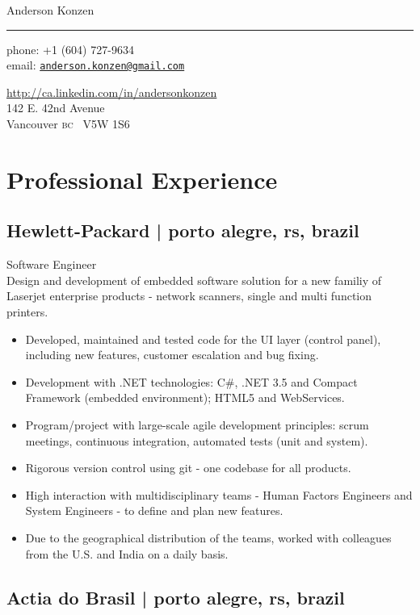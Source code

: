\documentclass[10pt,a4paper]{article}
\makeatletter
\def\myname{Anderson Konzen}
\def\myemail{anderson.konzen@gmail.com}
\def\myskype{andersonkonzen}
\def\mycellphone{+1 (604) 727-9634}
\def\mylinkedin{http://ca.linkedin.com/in/andersonkonzen}
\def\myaddress{142 E. 42nd Avenue\\Vancouver \textsc{bc} \ V5W 1S6}
\newcommand{\years}[1]{\marginnote{#1}}
\makeatother
\begin{document}
{\LARGE \myname}\\
\hrule
\vspace{0.2in}
{\large phone: \mycellphone}\\[.05cm]
{\large email: \href{mailto:\myemail}{\texttt{\myemail}}}\\[.05cm]
{\large \href{\mylinkedin}{\mylinkedin}\\[.2cm]
\myaddress
\vspace{0.5in}

\section*{Professional Experience}

\subsection*{Hewlett-Packard | {\footnotesize{porto alegre, rs, brazil}}}

\years{2010-2012}Software Engineer\\
Design and development of embedded software solution for a new familiy of Laserjet enterprise products - network scanners, single and multi function printers.
\begin{itemize}
\item Developed, maintained and tested code for the UI layer (control panel), including new features, customer escalation and bug fixing.
\item Development with .NET technologies: C\#, .NET 3.5 and Compact Framework (embedded environment); HTML5 and WebServices.
\item Program/project with large-scale agile development principles: scrum meetings, continuous integration, automated tests (unit and system).
\item Rigorous version control using git - one codebase for all products.
\item High interaction with multidisciplinary teams - Human Factors Engineers and System Engineers - to define and plan new features.
\item Due to the geographical distribution of the teams, worked with colleagues from the U.S. and India on a daily basis.
\end{itemize}

\subsection*{Actia do Brasil | {\footnotesize{porto alegre, rs, brazil}}}

}
\end{document}
